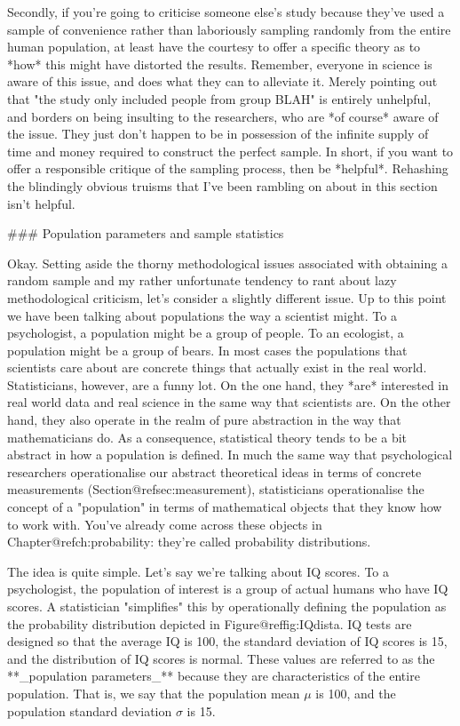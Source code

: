 Secondly, if you're going to criticise someone else's study because they've used a sample of convenience rather than laboriously sampling randomly from the entire human population, at least have the courtesy to offer a specific theory as to *how* this might have distorted the results. Remember, everyone in science is aware of this issue, and does what they can to alleviate it. Merely pointing out that "the study only included people from group BLAH" is entirely unhelpful, and borders on being insulting to the researchers, who are *of course* aware of the issue. They just don't happen to be in possession of the infinite supply of time and money required to construct the perfect sample. In short, if you want to offer a responsible critique of the sampling process, then be *helpful*. Rehashing the blindingly obvious truisms that I've been rambling on about in this section isn't helpful.

### Population parameters and sample statistics

Okay. Setting aside the thorny methodological issues associated with obtaining a random sample and my rather unfortunate tendency to rant about lazy methodological criticism, let's consider a slightly different issue. Up to this point we have been talking about populations the way a scientist might. To a psychologist, a population might be a group of people. To an ecologist, a population might be a group of bears. In most cases the populations that scientists care about are concrete things that actually exist in the real world. Statisticians, however, are a funny lot. On the one hand, they *are* interested in real world data and real science in the same way that scientists are. On the other hand, they also operate in the realm of pure abstraction in the way that mathematicians do. As a consequence, statistical theory tends to be a bit abstract in how a population is defined. In much the same way that psychological researchers operationalise our abstract theoretical ideas in terms of concrete measurements (Section@refsec:measurement), statisticians operationalise the concept of a "population" in terms of mathematical objects that they know how to work with. You've already come across these objects in Chapter@refch:probability: they're called probability distributions.

The idea is quite simple. Let's say we're talking about IQ scores. To a psychologist, the population of interest is a group of actual humans who have IQ scores. A statistician "simplifies" this by operationally defining the population as the probability distribution depicted in Figure@reffig:IQdista. IQ tests are designed so that the average IQ is 100, the standard deviation of IQ scores is 15, and the distribution of IQ scores is normal. These values are referred to as the **_population parameters_** because they are characteristics of the entire population. That is, we say that the population mean $\mu$ is 100, and the population standard deviation $\sigma$ is 15.

